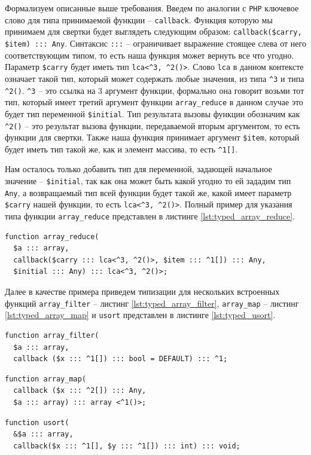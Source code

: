 Формализуем описанные выше требования.
Введем по аналогии с \verb|PHP| ключевое слово для типа принимаемой функции -- \verb|callback|.
Функция которую мы принимаем для свертки будет выглядеть следующим образом: \verb|callback($carry, $item) ::: Any|.
Синтаксис \verb|:::| -- ограничивает выражение стоящее слева от него соответствующим типом, то есть наша функция может вернуть все что угодно.
Параметр \verb|$carry| будет иметь тип \verb|lca<^3, ^2()>|.
Слово \verb|lca| в данном контексте означает такой тип, который может содержать любые значения, из типа \verb|^3| и типа \verb|^2()|.
\verb|^3| -- это ссылка на 3 аргумент функции, формально она говорит возьми тот тип, который имеет третий аргумент функции \verb|array_reduce| в данном случае это будет тип переменной \verb|$initial|.
Тип результата вызовы функции обозначим как \verb|^2()| -- это результат вызова функции, передаваемой вторым аргументом, то есть функции для свертки.
Также наша функция принимает аргумент \verb|$item|, который будет иметь тип такой же, как и элемент массива, то есть \verb|^1[]|.

Нам осталось только добавить тип для переменной, задающей начальное значение -- \verb|$initial|, так как она может быть какой угодно то ей зададим тип \verb|Any|,  а возвращаемый тип всей функции будет такой же, какой имеет параметр \verb|$carry| нашей функции, то есть \verb|lca<^3, ^2()>|.
Полный пример для указания типа функции \verb|array_reduce| представлен в листинге \ref{lst:typed_array_reduce}.
\begin{lstlisting}[caption={Пример типизации функции array\_reduce},label={lst:typed_array_reduce}]
function array_reduce(
  $a ::: array,
  callback($carry ::: lca<^3, ^2()>, $item ::: ^1[]) ::: Any,
  $initial ::: Any) ::: lca<^3, ^2()>;
\end{lstlisting}

Далее в качестве примера приведем типизации для нескольких встроенных функций \verb|array_filter| -- листинг \ref{lst:typed_array_filter}, \verb|array_map| -- листинг \ref{lst:typed_array_map} и \verb|usort| представлен в листинге \ref{lst:typed_usort}.
\begin{lstlisting}[caption={Пример типизации функции array\_filter},label={lst:typed_array_filter}]
function array_filter(
  $a ::: array,
  callback ($x ::: ^1[]) ::: bool = DEFAULT) ::: ^1;
\end{lstlisting}
\begin{lstlisting}[caption={Пример типизации функции array\_map},label={lst:typed_array_map}]
function array_map(
  callback ($x ::: ^2[]) ::: Any,
  $a ::: array) ::: array <^1()>;
\end{lstlisting}
\begin{lstlisting}[caption={Пример типизации функции usort},label={lst:typed_usort}]
function usort(
  &$a ::: array,
  callback($x ::: ^1[], $y ::: ^1[]) ::: int) ::: void;
\end{lstlisting}


